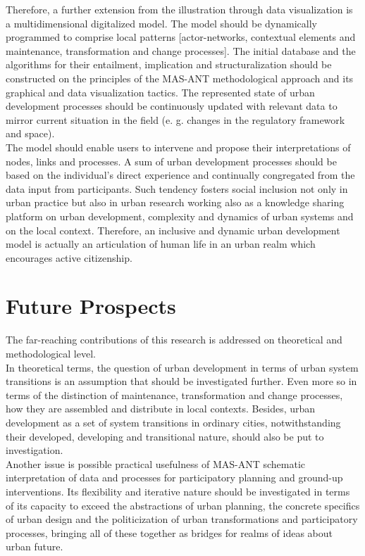 \documentclass[11pt]{report}
\begin{document}
{Therefore, a further extension from the illustration through data visualization is a multidimensional digitalized model.
The model should be dynamically programmed to comprise local patterns [actor-networks, contextual elements and maintenance, transformation and change processes].
The initial database and the algorithms for their entailment, implication and structuralization should be constructed on the principles of the MAS-ANT methodological approach and its graphical and data visualization tactics.
The represented state of urban development processes should be continuously updated with relevant data to mirror current situation in the field (e. g. changes in the regulatory framework and space).
\\

The model should enable users to intervene and propose their interpretations of nodes, links and processes.
A sum of urban development processes should be based on the individual's direct experience and continually congregated from the data input from participants.
Such tendency fosters social inclusion not only in urban practice but also in urban research working also as a knowledge sharing platform on urban development, complexity and dynamics of urban systems and on the local context.
Therefore, an inclusive and dynamic urban development model is actually an articulation of human life in an urban realm which encourages active citizenship.

\section{Future Prospects}

The far-reaching contributions of this research is addressed on theoretical and methodological level. 
\\
In theoretical terms, the question of urban development in terms of urban system transitions is an assumption that should be investigated further. Even more so in terms of the distinction of maintenance, transformation and change processes, how they are assembled and distribute in local contexts.
Besides, urban development as a set of system transitions in ordinary cities, notwithstanding their developed, developing and transitional nature, should also be put to investigation. 
\\

Another issue is possible practical usefulness of MAS-ANT schematic interpretation of data and processes for participatory planning and ground-up interventions.
Its flexibility and iterative nature should be investigated in terms of its capacity to exceed the abstractions of urban planning, the concrete specifics of urban design and the politicization of urban transformations and participatory processes, bringing all of these together as bridges for realms of ideas about urban future.
\\

}
\end{document}

